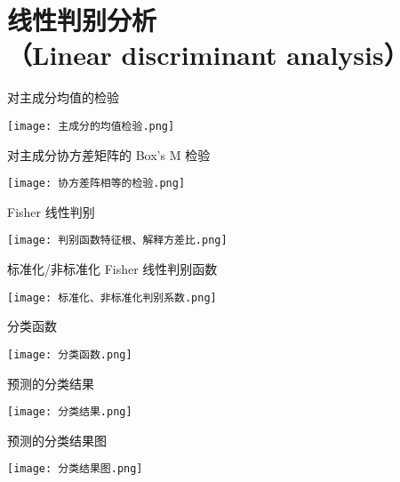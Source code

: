 

\part{线性判别分析\\（Linear discriminant analysis）}


\begin{frame}{对主成分均值的检验}
    \begin{center}
        \texttt{[image: 主成分的均值检验.png]}
    \end{center}
    \vspace{-0.5cm}
\end{frame}


\begin{frame}{对主成分协方差矩阵的 Box's M 检验}
    \begin{center}
        \texttt{[image: 协方差阵相等的检验.png]}
    \end{center}
    \vspace{-0.5cm}
\end{frame}


\begin{frame}{Fisher 线性判别}
    \begin{center}
        \texttt{[image: 判别函数特征根、解释方差比.png]}
    \end{center}
    \vspace{-0.5cm}
\end{frame}


\begin{frame}{标准化/非标准化 Fisher 线性判别函数}

    \begin{center}
        \texttt{[image: 标准化、非标准化判别系数.png]}
    \end{center}
    \vspace{-0.5cm}

\end{frame}


\begin{frame}{分类函数}
    \begin{center}
        \texttt{[image: 分类函数.png]}
    \end{center}
    \vspace{-0.5cm}
\end{frame}


\begin{frame}{预测的分类结果}
    \begin{center}
        \texttt{[image: 分类结果.png]}
    \end{center}
    \vspace{-0.5cm}
\end{frame}


\begin{frame}{预测的分类结果图}
    \begin{center}
        \texttt{[image: 分类结果图.png]}
    \end{center}
    \vspace{-0.5cm}
\end{frame}
